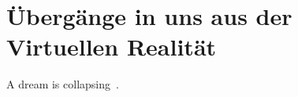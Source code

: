 \section{Übergänge in uns aus der Virtuellen Realität}\label{sec:relatedWork.vr}

A dream is collapsing~\cite{knibbe2018dream}.
